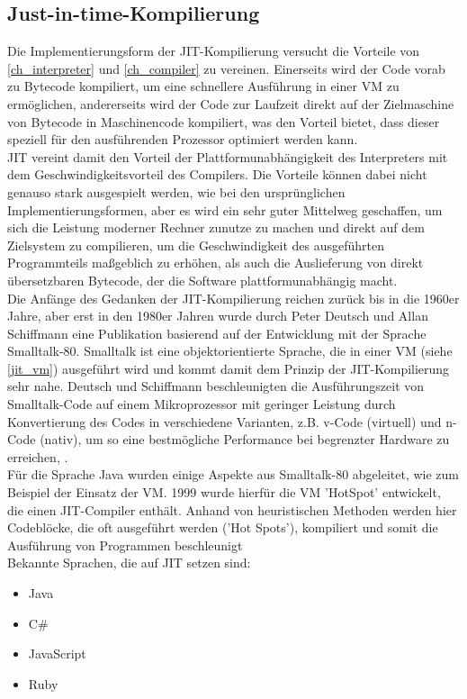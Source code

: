 \subsection{Just-in-time-Kompilierung} \label{ch_jit}
Die Implementierungsform der \ac{JIT}-Kompilierung versucht die Vorteile von \autoref{ch_interpreter} und \autoref{ch_compiler} zu vereinen. Einerseits wird der Code vorab zu Bytecode kompiliert, um eine schnellere Ausführung in einer \ac{VM} zu ermöglichen, andererseits wird der Code zur Laufzeit direkt auf der Zielmaschine von Bytecode in Maschinencode kompiliert, was den Vorteil bietet, dass dieser speziell für den ausführenden Prozessor optimiert werden kann.\\
\ac{JIT} vereint damit den Vorteil der Plattformunabhängigkeit des Interpreters mit dem Geschwindigkeitsvorteil des Compilers. Die Vorteile können dabei nicht genauso stark ausgespielt werden, wie bei den ursprünglichen Implementierungsformen, aber es wird ein sehr guter Mittelweg geschaffen, um sich die Leistung moderner Rechner zunutze zu machen und direkt auf dem Zielsystem zu compilieren, um die Geschwindigkeit des ausgeführten Programmteils maßgeblich zu erhöhen, als auch die Auslieferung von direkt übersetzbaren Bytecode, der die Software plattformunabhängig macht.\\
Die Anfänge des Gedanken der \ac{JIT}-Kompilierung reichen zurück bis in die 1960er Jahre, aber erst in den 1980er Jahren wurde durch Peter Deutsch und Allan Schiffmann eine Publikation basierend auf der Entwicklung mit der Sprache Smalltalk-80. Smalltalk ist eine objektorientierte Sprache, die in einer \ac{VM} (siehe \autoref{jit_vm}) ausgeführt wird und kommt damit dem Prinzip der \ac{JIT}-Kompilierung sehr nahe. Deutsch und Schiffmann beschleunigten die Ausführungszeit von Smalltalk-Code auf einem Mikroprozessor mit geringer Leistung durch Konvertierung des Codes in verschiedene Varianten, z.B. v-Code (virtuell) und n-Code (nativ), um so eine bestmögliche Performance bei begrenzter Hardware zu erreichen, \cite[vgl. Deutsch und Schiffmann 1984, S.1ff]{Deutsch_Schiffmann1984}.\\
Für die Sprache Java wurden einige Aspekte aus Smalltalk-80 abgeleitet, wie zum Beispiel der Einsatz der \ac{VM}. 1999 wurde hierfür die \ac{VM} 'HotSpot' entwickelt, die einen \ac{JIT}-Compiler enthält. Anhand von heuristischen Methoden werden hier Codeblöcke, die oft ausgeführt werden ('Hot Spots'), kompiliert und somit die Ausführung von Programmen beschleunigt \cite[vgl. Kotzmann und Wimmer 2008, S.2ff]{KotzmannWimmer2008}\\
Bekannte Sprachen, die auf \ac{JIT} setzen sind: 
\begin{itemize}
    \item Java
    \item C\#
    \item JavaScript
    \item Ruby
\end{itemize}



